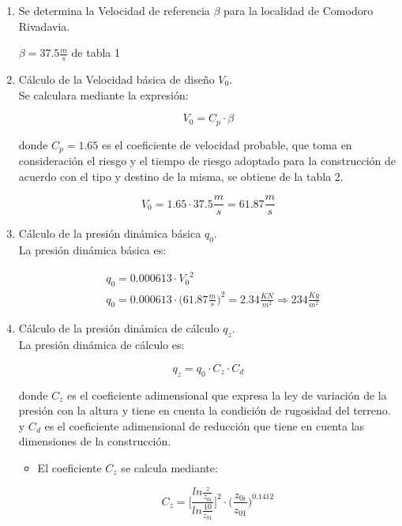 \begin{enumerate}
\item Se determina la Velocidad de referencia $\beta$ para la localidad de Comodoro Rivadavia.\\

	\begin{center}
		$\beta=37.5 \frac{m}{s}$ de tabla 1
	\end{center}

\item Cálculo de la Velocidad básica de diseño $V_0$.\\
Se calculara mediante la expresión:

$$V_0=C_p \cdot \beta$$

donde $C_p=1.65$ es el coeficiente de velocidad probable, que toma en consideración el riesgo y el tiempo de riesgo adoptado para la construcción de acuerdo con el tipo y destino de la misma, se obtiene de la tabla 2.

$$V_0=1.65 \cdot 37.5 \frac{m}{s} = 61.87 \frac{m}{s}$$

\item Cálculo de la presión dinámica básica $q_0$.\\
La presión dinámica básica es:

	\begin{align*}
	& q_0=0.000613 \cdot {V_0}^2 \\
	& q_0=0.000613 \cdot {\Big(61.87 \frac{m}{s}\Big)}^2=2.34 \frac{KN}{m^2} \Rightarrow 234 \frac{Kg}{m^2}
	\end{align*}

\item Cálculo de la presión dinámica de cálculo $q_z$.\\
La presión dinámica de cálculo es:

$$q_z=q_0 \cdot C_z \cdot C_d$$

donde $C_z$ es el coeficiente adimensional que expresa la ley de variación de la presión con la altura y tiene en cuenta la condición de rugosidad del terreno.\\
y $C_d$ es el coeficiente adimensional de reducción  que tiene en cuenta las dimensiones de la construcción.\\

\begin{itemize}
\item El coeficiente $C_z$ se calcula mediante:



$$C_z= \Bigg[\frac{ln\frac{z}{z_{0i}}} {ln\frac{10}{z_{01}}}\Bigg]^2 \cdot \Bigg(\frac{z_{0i}}{z_{01}}\Bigg)^{0.1412}$$


\end{itemize}
\end{enumerate}
